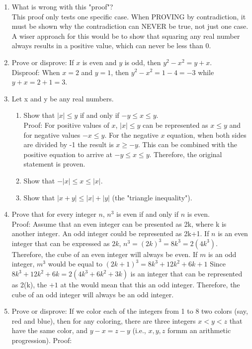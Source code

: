 \documentclass{article}
\begin{document}
\begin{enumerate}
\item What is wrong with this "proof"? \\
    This proof only tests one specific case. When PROVING by contradiction, it must be shown why the contradiction can NEVER be true, not just one case. A wiser approach for this would be to show that squaring any real number always results in a positive value, which can never be less than 0. 
\item Prove or disprove: If $x$ is even and $y$ is odd, then $y^2-x^2=y+x$. \\
    Disproof: When $x=2$ and $y=1$, then $y^2-x^2=1-4=-3$ while $y+x=2+1=3$. \Lightning
\item Let x and y be any real numbers.
    \begin{enumerate}
        \item Show that $|x| \leq y$ if and only if $-y \leq x \leq y$. \\
            Proof: For positive values of $x$, $|x| \leq y$ can be represented as $x \leq y$ and for negative values $-x \leq y$. For the negative $x$ equation, when both sides are divided by -1 the result is $x \geq -y$. This can be combined with the positive equation to arrive at $-y \leq x \leq y$. Therefore, the original statement is proven. 
        \item Show that $-|x| \leq x \leq |x|$.
        \item Show that $|x+y| \leq |x| + |y|$ (the "triangle inequality").
    \end{enumerate}
\item Prove that for every integer $n$, $n^3$ is even if and only if $n$ is even. \\
    Proof: Assume that an even integer can be presented as 2k, where k is another integer. An odd integer could be represented as 2k+1. If $n$ is an even integer that can be expressed as $2k$, $n^3 = (2k)^3 = 8k^3 = 2(4k^3)$. Therefore, the cube of an even integer will always be even. If $m$ is an odd integer, $m^3$ would be equal to $(2k+1)^3 = 8k^3 + 12k^2 + 6k + 1$ Since $8k^3 + 12k^2 + 6k = 2(4k^3+6k^2+3k)$ is an integer that can be represented as 2(k), the $+1$ at the would mean that this an odd integer. Therefore, the cube of an odd integer will always be an odd integer.
\item Prove or disprove: If we color each of the integers from 1 to 8 two colors (say, red and blue), then for any coloring, there are three integers $x<y<z$ that have the same color, and $y-x=z-y$ (i.e., $x,y,z$ formm an arithmetic progression).
    Proof:
\end{enumerate}
\end{document}
